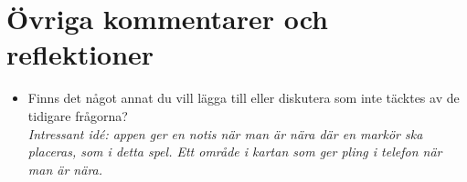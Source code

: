 \documentclass{article}
\begin{document}
\section*{Övriga kommentarer och reflektioner}
\begin{itemize}[label=]
    \item Finns det något annat du vill lägga till eller diskutera som inte täcktes av de tidigare frågorna?\\
    \textit{Intressant idé: appen ger en notis när man är nära där en markör ska placeras, som i detta spel. Ett område i kartan som ger pling i telefon när man är nära.}
\end{itemize}
\thispagestyle{empty}
\end{document}

